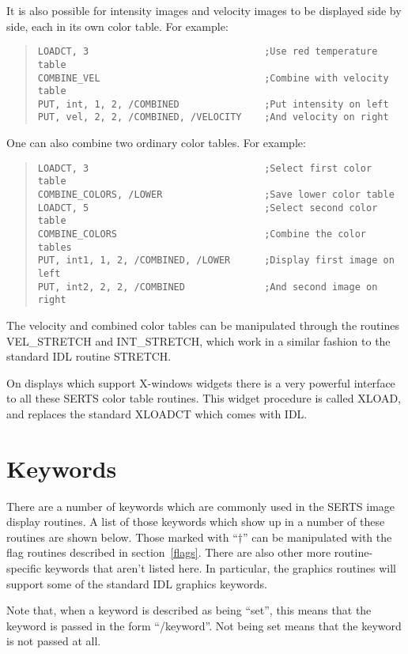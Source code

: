 It is also possible for intensity images and velocity images to be displayed
side by side, each in its own color table.  For example:
\begin{quote}
\begin{verbatim}
LOADCT, 3                               ;Use red temperature table
COMBINE_VEL                             ;Combine with velocity table
PUT, int, 1, 2, /COMBINED               ;Put intensity on left
PUT, vel, 2, 2, /COMBINED, /VELOCITY    ;And velocity on right
\end{verbatim}
\end{quote}

One can also combine two ordinary color tables.  For example:
\begin{quote}
\begin{verbatim}
LOADCT, 3                               ;Select first color table
COMBINE_COLORS, /LOWER                  ;Save lower color table
LOADCT, 5                               ;Select second color table
COMBINE_COLORS                          ;Combine the color tables
PUT, int1, 1, 2, /COMBINED, /LOWER      ;Display first image on left
PUT, int2, 2, 2, /COMBINED              ;And second image on right
\end{verbatim}
\end{quote}

The velocity and combined color tables can be manipulated through the routines
VEL\_STRETCH and INT\_STRETCH, which work in a similar fashion to the standard
IDL routine STRETCH.

On displays which support X-windows widgets there is a very powerful interface
to all these SERTS color table routines.  This widget procedure is called
XLOAD, and replaces the standard XLOADCT which comes with IDL.

\section{Keywords}
\label{keywords}

There are a number of keywords which are commonly used in the SERTS image
display routines.  A list of those keywords which show up in a number of these
routines are shown below.  Those marked with ``$\dagger$'' can be manipulated
with the flag routines described in section~\ref{flags}.  There are also other
more routine-specific keywords that aren't listed here.  In particular, the
graphics routines will support some of the standard IDL graphics keywords.

Note that, when a keyword is described as being ``set'', this means that the
keyword is passed in the form ``/keyword''.  Not being set means that the
keyword is not passed at all.

